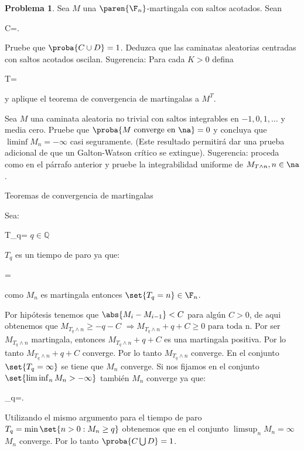 \documentclass[a5paper,oneside]{amsart}
\theoremstyle{plain}
\theoremstyle{definition}
\newtheorem{problema}{Problema}
\begin{document}
\begin{problema}
Sea $M$ una $\paren{\F_n}$-martingala con saltos acotados. Sean
\begin{esn}
C=\quad{}.
\end{esn}
Pruebe que $\proba{C\cup D}=1$. Deduzca que las caminatas aleatorias centradas con saltos acotados oscilan. Sugerencia: Para cada $K>0$ defina\begin{esn}
T=\min{}
\end{esn}y aplique el teorema de convergencia de martingalas a $M^T$. 

Sea $M$ una caminata aleatoria no trivial con saltos integrables en $-1,0,1,\ldots$ y  media cero. Pruebe que $\proba{M\text{ converge en }\na}=0$ y  concluya que $\liminf M_n=-\infty$ casi seguramente. (Este resultado permitir\'a dar una prueba adicional de que un Galton-Watson cr\'itico se extingue).  Sugerencia: proceda como en el p\'arrafo anterior y pruebe la integrabilidad uniforme de $M_{T\wedge n},n\in\na$.

 Teoremas de convergencia de martingalas

Sea:
\begin{esn}
T_q=\textrm{ $q \in \mathbb{Q}$}
\end{esn}

$T_q$ es un tiempo de paro ya que:
\begin{esn}
=
\end{esn}
como $M_n$ es martingala entonces $\set{T_q=n}\in \F_n$.


Por hip\'otesis tenemos que  $\abs{M_i-M_{i-1}} < C$ para alg\'un $C>0$, de aqui obtenemos que $
M_{T_q\wedge n}\geq -q-C$   $\Rightarrow M_{T_q\wedge n} + q + C \geq  0 \textrm{ para toda n}$. Por ser
$M_{T_q\wedge n} $  martingala, entonces $M_{T_q\wedge n} + q + C$ es una martingala positiva. Por lo tanto $M_{T_q\wedge n}+q+C$   converge. Por lo tanto $M_{T_q\wedge n}$ converge. En el  conjunto  $\set{T_q=\infty}$ se tiene que $M_n$ converge. Si nos fijamos en el conjunto $\set{\liminf_n{M_n}>-\infty}$ tambi\'en $M_n$ converge ya que:
\begin{esn}
\bigcup_q=.
\end{esn}
Utilizando el mismo argumento para el tiempo de paro $T_q=\min{\set{n>0: M_n \geq q}}$ obtenemos que en el conjunto $\limsup_n{M_n}=\infty$ $M_n$ converge. Por lo tanto $\proba{C\bigcup D}=1$.


\end{problema}
\end{document}
